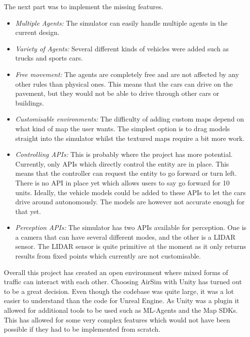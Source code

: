 The next part was to implement the missing features. 
\begin{itemize}
    \item \emph{Multiple Agents:} The simulator can easily handle multiple agents in the current design. 
    \item \emph{Variety of Agents:} Several different kinds of vehicles were added such as trucks and sports cars. 
    \item \emph{Free movement:} The agents are completely free and are not affected by any other rules than physical ones. This means that the cars can drive on the pavement, but they would not be able to drive through other cars or buildings.
    \item \emph{Customisable environments:} The difficulty of adding custom maps depend on what kind of map the user wants. The simplest option is to drag models straight into the simulator whilst the textured maps require a bit more work.
    \item \emph{Controlling APIs:} This is probably where the project has more potential. Currently, only APIs which directly control the entity are in place. This means that the controller can request the entity to go forward or turn left. There is no API in place yet which allows users to say go forward for 10 units. Ideally, the vehicle models could be added to these APIs to let the cars drive around autonomously. The models are however not accurate enough for that yet.  
    \item \emph{Perception APIs:} The simulator has two APIs available for perception. One is a camera that can have several different modes, and the other is a LIDAR sensor. The LIDAR sensor is quite primitive at the moment as it only returns results from fixed points which currently are not customisable. 
\end{itemize}

Overall this project has created an open environment where mixed forms of traffic can interact with each other.  Choosing AirSim with Unity has turned out to be a great decision. Even though the codebase was quite large, it was a lot easier to understand than the code for Unreal Engine. As Unity was a plugin it allowed for additional tools to be used such as ML-Agents and the Map SDKs. This has allowed for some very complex features which would not have been possible if they had to be implemented from scratch. 




